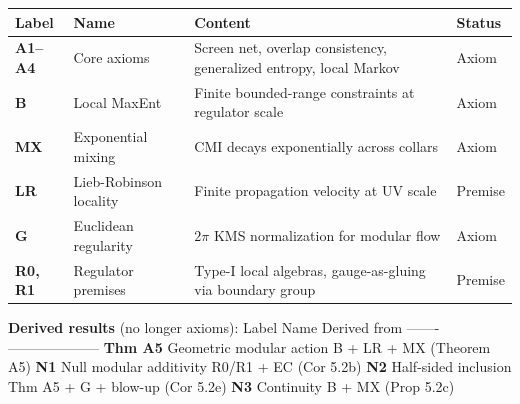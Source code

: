 \documentclass[11pt,a4paper]{article}
\theoremstyle{remark}
\begin{document}
{\def\LTcaptype{none} %
\begin{longtable}[]{@{}
  >{\raggedright\arraybackslash}p{}
  >{\raggedright\arraybackslash}p{}
  >{\raggedright\arraybackslash}p{}
  >{\raggedright\arraybackslash}p{}@{}}
\toprule\noalign{}
\begin{minipage}[b]{\linewidth}\raggedright
Label
\end{minipage} & \begin{minipage}[b]{\linewidth}\raggedright
Name
\end{minipage} & \begin{minipage}[b]{\linewidth}\raggedright
Content
\end{minipage} & \begin{minipage}[b]{\linewidth}\raggedright
Status
\end{minipage} \\
\midrule\noalign{}
\endhead
\bottomrule\noalign{}
\endlastfoot
\textbf{A1--A4} & Core axioms & Screen net, overlap consistency, generalized entropy, local Markov & Axiom \\
\textbf{B} & Local MaxEnt & Finite bounded-range constraints at regulator scale & Axiom \\
\textbf{MX} & Exponential mixing & CMI decays exponentially across collars & Axiom \\
\textbf{LR} & Lieb-Robinson locality & Finite propagation velocity at UV scale & Premise \\
\textbf{G} & Euclidean regularity & \(2\pi\) KMS normalization for modular flow & Axiom \\
\textbf{R0, R1} & Regulator premises & Type-I local algebras, gauge-as-gluing via boundary group & Premise \\
\end{longtable}
}

\textbf{Derived results} (no longer axioms):
\textbar{} Label \textbar{} Name \textbar{} Derived from \textbar{}
\textbar-------\textbar------\textbar--------------\textbar{}
\textbar{} \textbf{Thm A5} \textbar{} Geometric modular action \textbar{} B + LR + MX (Theorem A5) \textbar{}
\textbar{} \textbf{N1} \textbar{} Null modular additivity \textbar{} R0/R1 + EC (Cor 5.2b) \textbar{}
\textbar{} \textbf{N2} \textbar{} Half-sided inclusion \textbar{} Thm A5 + G + blow-up (Cor 5.2e) \textbar{}
\textbar{} \textbf{N3} \textbar{} Continuity \textbar{} B + MX (Prop 5.2c) \textbar{}
\end{document}
